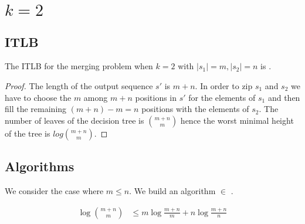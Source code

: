 \section{$k=2$}
\label{tree:merging:k=2}

\subsection{ITLB}
\label{tree:merging:k=2:ITLB}


\begin{theorem}
The ITLB for the merging problem when $k = 2$ with $|s_1| = m, |s_2| = n$ is .
\end{theorem}

\begin{proof}
The length of the output sequence $s'$ is $m+n$. In order to zip $s_1$ and $s_2$ we have to choose the $m$ among $m+n$ positions in $s'$ for the elements of $s_1$ and then fill the remaining $(m+n) - m = n$ positions with the elements of $s_2$. The number of leaves of the decision tree is $\binom{m+n}{m}$ hence the worst minimal height of the tree is $log \binom{m+n}{m}$.
\end{proof}



\subsection{Algorithms}
\label{tree:merging:k=2:alg}

We consider the case where $m \leq n$. We build an algorithm $\in$ .

\begin{lemma}
\begin{align*}
\log\binom{m+n}{m} &\leq m \log\frac{m+n}{m} + n \log\frac{m+n}{n}\\
\end{align*}
\end{lemma}

